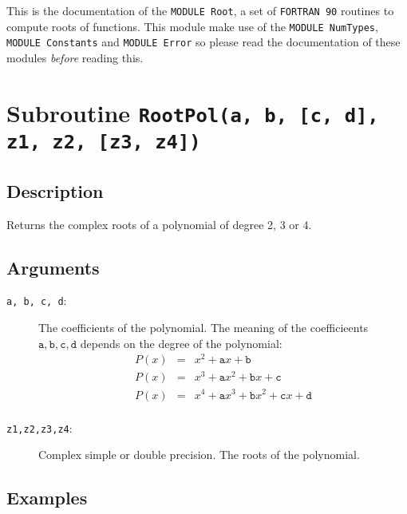 This is the documentation of the \texttt{MODULE Root}, a set
of \texttt{FORTRAN 90} routines to compute roots of functions. This
module make use of the \texttt{MODULE NumTypes}, \texttt{MODULE
  Constants} and \texttt{MODULE Error} so please read the
documentation of these modules \emph{before} reading this. 


\section{Subroutine \texttt{RootPol(a, b, [c, d], z1, z2, [z3, z4])}}

\subsection{Description}

Returns the complex roots of a polynomial of degree 2, 3 or 4. 

\subsection{Arguments}

\begin{description}
\item[\texttt{a, b, c, d}:] The coefficients of the polynomial. The
  meaning of the coefficieents $\mathtt{a,b,c,d}$ depends on the
  degree of the polynomial:
  \begin{eqnarray*}
    P(x) &=& x^2 + \mathtt{a}x + \mathtt{b} \\
    P(x) &=& x^3 + \mathtt{a}x^2 + \mathtt{b}x + \mathtt{c}\\
    P(x) &=& x^4 + \mathtt{a}x^3 + \mathtt{b}x^2 + \mathtt{c}x + \mathtt{d}\\
  \end{eqnarray*}
\item[\texttt{z1,z2,z3,z4}:] Complex simple or double precision. The
  roots of the polynomial.
\end{description}

\subsection{Examples}


